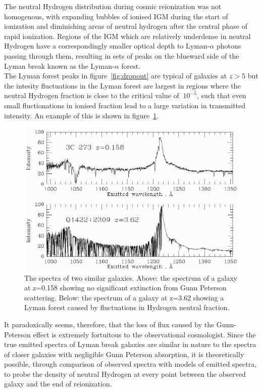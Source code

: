\documentclass[pdf,color]{UoBnote}
\begin{document}
The neutral Hydrogen distribution during cosmic reionization was not homogenous, with expanding bubbles of ionised IGM during the start of ionization and diminishing areas of neutral hydrogen after the central phase of rapid ionization. Regions of the IGM which are relatively underdense in neutral Hydrogen have a correspondingly smaller optical depth to Lyman-$\alpha$ photons passing through them, resulting in sets of peaks on the blueward side of the Lyman break known as the Lyman-$\alpha$ forest. \\

The Lyman forest peaks in figure~\ref{fig:dropout} are typical of galaxies at $z>5$ but the intesity fluctuations in the Lyman forest are largest in regions where the neutral Hydrogen fraction is close to the critical value of $~10^{-5}$, such that even small fluctionations in ionised fraction lead to a large variation in transmitted intensity. An example of this is shown in figure~\ref{fig:forest}.\\
\begin{figure}[h]	\begin{center}
\includegraphics[scale=0.35]{images/forest.png}
\caption{The spectra of two similar galaxies. Above: the spectrum of a galaxy at z=0.158 showing no significant extinction from Gunn Peterson scattering. Below: the spectrum of a galaxy at z=3.62 showing a Lyman forest caused by fluctuations in Hydrogen neutral fraction.}
\label{fig:forest}
\end{center}		\end{figure}

It paradoxically seems, therefore, that the loss of flux caused by the Gunn-Peterson effect is extremely fortuitous to the observational cosmologist. Since the true emitted spectra of Lyman break galaxies are similar in nature to the spectra of closer galaxies with negligible Gunn Peterson absorption, it is theoretically possible, through comparison of observed spectra with models of emitted spectra, to probe the density of neutral Hydrogen at every point between the observed galaxy and the end of reionization.\\
\end{document}

